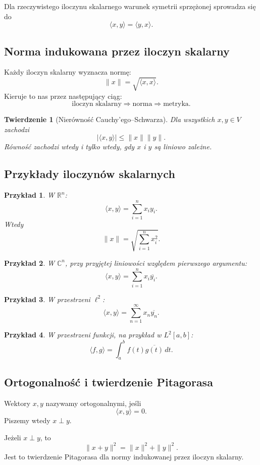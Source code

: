 \documentclass{article}
\newtheorem{twierdzenie}{Twierdzenie}
\newtheorem{przyklad}{Przykład}
\begin{document}
Dla rzeczywistego iloczynu skalarnego warunek symetrii sprzężonej sprowadza się do
\[
\langle x,y\rangle=\langle y,x\rangle.
\]

\subsection{Norma indukowana przez iloczyn skalarny}
Każdy iloczyn skalarny wyznacza normę:
\[
\|x\|=\sqrt{\langle x,x\rangle}.
\]
Kieruje to nas przez następujący ciąg:
\[
\boxed{\text{iloczyn skalarny}\Longrightarrow\text{norma}\Longrightarrow\text{metryka}.}
\]

\begin{twierdzenie}[Nierówność Cauchy'ego--Schwarza]
Dla wszystkich $x,y\in V$ zachodzi
\[
|\langle x,y\rangle|\leq\|x\|\|y\|.
\]
Równość zachodzi wtedy i tylko wtedy, gdy $x$ i $y$ są liniowo zależne.
\end{twierdzenie}

\subsection{Przykłady iloczynów skalarnych}
\begin{przyklad}
W $\mathbb R^n$:
\[
\langle x,y\rangle=\sum_{i=1}^n x_i y_i.
\]
Wtedy
\[
\|x\|=\sqrt{\sum_{i=1}^n x_i^2}.
\]
\end{przyklad}

\begin{przyklad}
W $\mathbb C^n$, przy przyjętej liniowości względem pierwszego argumentu:
\[
\langle x,y\rangle=\sum_{i=1}^n x_i\overline{y_i}.
\]
\end{przyklad}

\begin{przyklad}
W przestrzeni $\ell^2$:
\[
\langle x,y\rangle=\sum_{n=1}^{\infty}x_n\overline{y_n}.
\]
\end{przyklad}

\begin{przyklad}
W przestrzeni funkcji, na przykład w $L^2[a,b]$:
\[
\langle f,g\rangle=\int_a^b f(t)\overline{g(t)}\,dt.
\]
\end{przyklad}

\subsection{Ortogonalność i twierdzenie Pitagorasa}
Wektory $x,y$ nazywamy ortogonalnymi, jeśli
\[
\langle x,y\rangle=0.
\]
Piszemy wtedy $x\perp y$.

Jeżeli $x\perp y$, to
\[
\|x+y\|^2=\|x\|^2+\|y\|^2.
\]
Jest to twierdzenie Pitagorasa dla normy indukowanej przez iloczyn skalarny.
\end{document}
